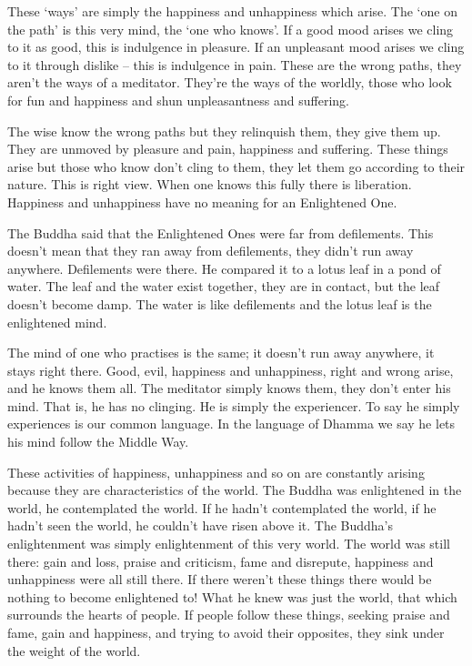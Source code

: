 These `ways' are simply the happiness and unhappiness which arise. The `one on the path' is this very mind, the `one who knows'. If a good mood arises we cling to it as good, this is indulgence in pleasure. If an unpleasant mood arises we cling to it through dislike -- this is indulgence in pain. These are the wrong paths, they aren't the ways of a meditator. They're the ways of the worldly, those who look for fun and happiness and shun unpleasantness and suffering.

The wise know the wrong paths but they relinquish them, they give them up. They are unmoved by pleasure and pain, happiness and suffering. These things arise but those who know don't cling to them, they let them go according to their nature. This is right view. When one knows this fully there is liberation. Happiness and unhappiness have no meaning for an Enlightened One.

The Buddha said that the Enlightened Ones were far from defilements. This doesn't mean that they ran away from defilements, they didn't run away anywhere. Defilements were there. He compared it to a lotus leaf in a pond of water. The leaf and the water exist together, they are in contact, but the leaf doesn't become damp. The water is like defilements and the lotus leaf is the enlightened mind.

The mind of one who practises is the same; it doesn't run away anywhere, it stays right there. Good, evil, happiness and unhappiness, right and wrong arise, and he knows them all. The meditator simply knows them, they don't enter his mind. That is, he has no clinging. He is simply the experiencer. To say he simply experiences is our common language. In the language of Dhamma we say he lets his mind follow the Middle Way.

These activities of happiness, unhappiness and so on are constantly arising because they are characteristics of the world. The Buddha was enlightened in the world, he contemplated the world. If he hadn't contemplated the world, if he hadn't seen the world, he couldn't have risen above it. The Buddha's enlightenment was simply enlightenment of this very world. The world was still there: gain and loss, praise and criticism, fame and disrepute, happiness and unhappiness were all still there. If there weren't these things there would be nothing to become enlightened to! What he knew was just the world, that which surrounds the hearts of people. If people follow these things, seeking praise and fame, gain and happiness, and trying to avoid their opposites, they sink under the weight of the world.

